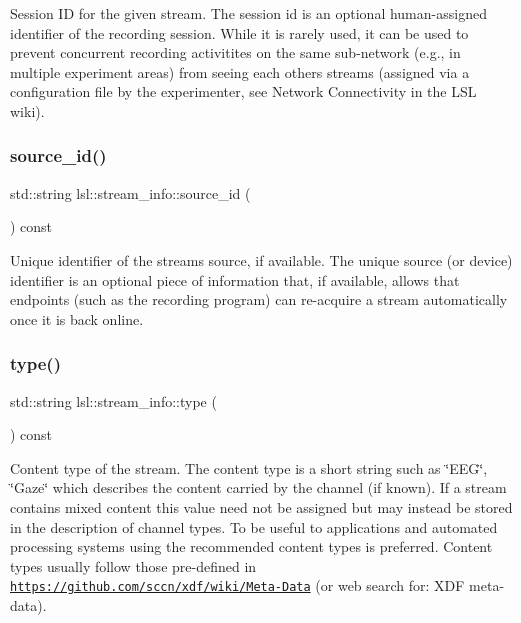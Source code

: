 Session ID for the given stream. The session id is an optional human-\/assigned identifier of the recording session. While it is rarely used, it can be used to prevent concurrent recording activitites on the same sub-\/network (e.\+g., in multiple experiment areas) from seeing each other\textquotesingle{}s streams (assigned via a configuration file by the experimenter, see Network Connectivity in the L\+SL wiki). \mbox{\label{classlsl_1_1stream__info_a1f20c68246a88047978d9b03e14a9d2b}} 
\subsubsection{\texorpdfstring{source\+\_\+id()}{source\_id()}}
{\footnotesize\ttfamily std\+::string lsl\+::stream\+\_\+info\+::source\+\_\+id (\begin{DoxyParamCaption}{ }\end{DoxyParamCaption}) const\hspace{0.3cm}{\ttfamily [inline]}}

Unique identifier of the stream\textquotesingle{}s source, if available. The unique source (or device) identifier is an optional piece of information that, if available, allows that endpoints (such as the recording program) can re-\/acquire a stream automatically once it is back online. \mbox{\label{classlsl_1_1stream__info_a2162830f6867e9513eba9385eb0cbb99}} 
\subsubsection{\texorpdfstring{type()}{type()}}
{\footnotesize\ttfamily std\+::string lsl\+::stream\+\_\+info\+::type (\begin{DoxyParamCaption}{ }\end{DoxyParamCaption}) const\hspace{0.3cm}{\ttfamily [inline]}}

Content type of the stream. The content type is a short string such as \char`\"{}\+E\+E\+G\char`\"{}, \char`\"{}\+Gaze\char`\"{} which describes the content carried by the channel (if known). If a stream contains mixed content this value need not be assigned but may instead be stored in the description of channel types. To be useful to applications and automated processing systems using the recommended content types is preferred. Content types usually follow those pre-\/defined in \href{https://github.com/sccn/xdf/wiki/Meta-Data}{\tt https\+://github.\+com/sccn/xdf/wiki/\+Meta-\/\+Data} (or web search for\+: X\+DF meta-\/data). \mbox{\label{classlsl_1_1stream__info_ae6fa890ffd440f298dd02fe71eaf3b82}} 
